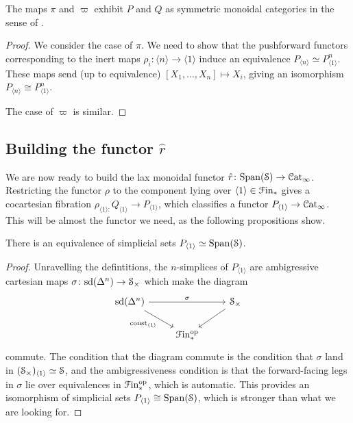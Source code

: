 \documentclass[main.tex]{subfiles}
\begin{document}
\begin{proposition}
  The maps $\pi$ and $\varpi$ exhibit $P$ and $Q$ as symmetric monoidal categories in the sense of \cite[Def.~2.0.0.7]{luriehigheralgebra}.
\end{proposition}
\begin{proof}
  We consider the case of $\pi$. We need to show that the pushforward functors corresponding to the inert maps $\rho_{i}\colon \langle n \rangle \to \langle 1 \rangle$ induce an equivalence $P_{\langle n \rangle} \simeq P_{\langle 1 \rangle}^{n}$. These maps send (up to equivalence) $[X_{1}, \ldots, X_{n}] \mapsto X_{i}$, giving an isomorphism $P_{\langle n \rangle} \cong P_{\langle 1 \rangle}^{n}$.

  The case of $\varpi$ is similar.
\end{proof}

\subsection{Building the functor \texorpdfstring{$\hat{r}$}{r}}
\label{ssc:building_the_functor}

We are now ready to build the lax monoidal functor $\hat{r}\colon \Span(\S) \to \ICat$. Restricting the functor $\rho$ to the component lying over $\langle 1 \rangle \in \Finp$ gives a cocartesian fibration $\rho_{\langle 1 \rangle\colon }Q_{\langle 1 \rangle} \to P_{\langle 1 \rangle}$, which classifies a functor $P_{\langle 1 \rangle} \to \ICat$. This will be almost the functor we need, as the following propositions show.

\begin{proposition}
  There is an equivalence of simplicial sets $P_{\langle 1 \rangle} \simeq \Span(\S)$.
\end{proposition}
\begin{proof}
  Unravelling the defintitions, the $n$-simplices of $P_{\langle 1 \rangle}$ are ambigressive cartesian maps $\sigma\colon \sd(\Delta^{n}) \to \S_{\times}$ which make the diagram
  \begin{equation*}
    \begin{tikzcd}
      \sd(\Delta^{n})
      \arrow[rr, "\sigma"]
      \arrow[dr, swap, "\const_{\langle 1 \rangle}"]
      && \S_{\times}
      \arrow[dl]
      \\
      & \Finp\op
    \end{tikzcd}
  \end{equation*}
  commute. The condition that the diagram commute is the condition that $\sigma$ land in $(\S_{\times})_{\langle 1 \rangle} \simeq \S$, and the ambigressiveness condition is that the forward-facing legs in $\sigma$ lie over equivalences in $\Finp\op$, which is automatic. This provides an isomorphism of simplicial sets $P_{\langle 1 \rangle} \cong \Span(\S)$, which is stronger than what we are looking for.
\end{proof}
\end{document}

